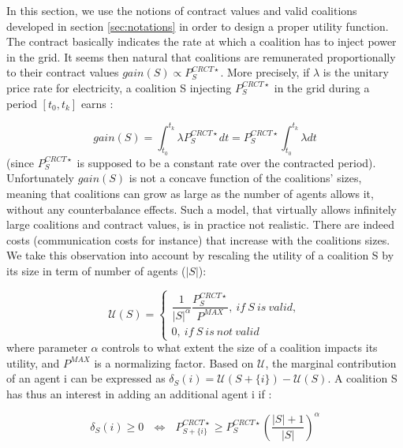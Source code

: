 \documentclass[journal]{IEEEtran}
\begin{document}
In this section, we use the notions of contract values and valid coalitions developed in section \ref{sec:notations} in order to design a proper utility function. The contract basically indicates the rate at which a coalition has to inject power in the grid. It seems then natural that coalitions are remunerated proportionally to their contract values $ gain(S) \propto P_{S}^{CRCT \star} $. More precisely, if $ \lambda $ is the unitary price rate for electricity, a coalition S injecting $ P_{S}^{CRCT \star} $ in the grid during a period $ [t_{0},t_{k}] $ earns :

\begin{equation}
gain(S) = \int_{t_{0}}^{t_{k}} \lambda P_{S}^{CRCT \star} dt = P_{S}^{CRCT \star} \int_{t_{0}}^{t_{k}} \lambda dt
\end{equation} 
(since $ P_{S}^{CRCT \star} $ is supposed to be a constant rate over the contracted period). Unfortunately $ gain(S) $ is not a concave function of the coalitions' sizes, meaning that coalitions can grow as large as the number of agents allows it, without any counterbalance effects. Such a model, that virtually allows infinitely large coalitions and contract values, is in practice not realistic. There are indeed costs (communication costs for instance) that increase with the coalitions sizes. We take this observation into account by rescaling the utility of a coalition S by its size in term of number of agents ($|S|$):

\begin{equation}
\mathcal{U}(S) = \left\{ \begin{array}{lll}
							\dfrac{1}{|S|^{\alpha}} \dfrac{ P_{S}^{CRCT \star} }{P^{MAX}},\ if\ S\ is\ valid, \\
							0,\ if\ S\ is\ not\ valid
						 \end{array}
				  \right.
\end{equation}
where parameter $ \alpha $ controls to what extent the size of a coalition impacts its utility, and $ P^{MAX} $ is a normalizing factor. Based on $ \mathcal{U} $, the marginal contribution of an agent i can be expressed as $ \delta_{S}(i) = \mathcal{U}(S+\{i\}) - \mathcal{U}(S) $. A coalition S has thus an interest in adding an additional agent i if : 

\begin{equation}
\delta_{S}(i) \geq 0 \ \ \ \Leftrightarrow \ \ \ P_{S+\{i\}}^{CRCT \star} \geq P_{S}^{CRCT \star} \left( \dfrac{|S|+1}{|S|} \right)^{\alpha}
\label{eq:marginal_benefit}
\end{equation}
\end{document}
